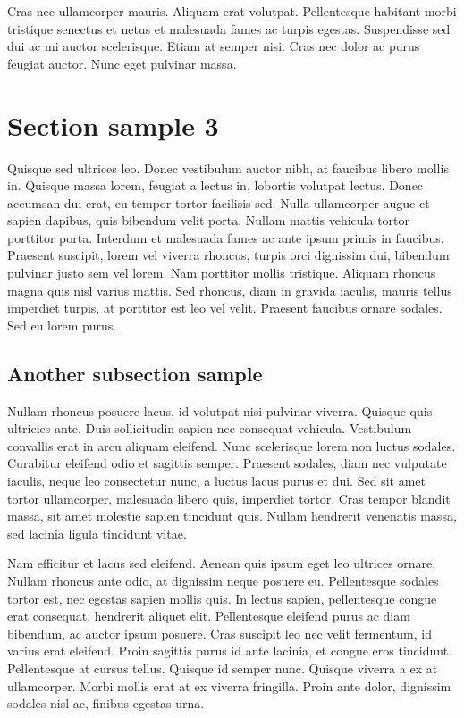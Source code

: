 Cras nec ullamcorper mauris. Aliquam erat volutpat. Pellentesque habitant morbi tristique senectus et netus et malesuada fames ac turpis egestas. Suspendisse sed dui ac mi auctor scelerisque. Etiam at semper nisi. Cras nec dolor ac purus feugiat auctor. Nunc eget pulvinar massa.

%

\section{Section sample 3}

Quisque sed ultrices leo. Donec vestibulum auctor nibh, at faucibus libero mollis in. Quisque massa lorem, feugiat a lectus in, lobortis volutpat lectus. Donec accumsan dui erat, eu tempor tortor facilisis sed. Nulla ullamcorper augue et sapien dapibus, quis bibendum velit porta. Nullam mattis vehicula tortor porttitor porta. Interdum et malesuada fames ac ante ipsum primis in faucibus. Praesent suscipit, lorem vel viverra rhoncus, turpis orci dignissim dui, bibendum pulvinar justo sem vel lorem. Nam porttitor mollis tristique. Aliquam rhoncus magna quis nisl varius mattis. Sed rhoncus, diam in gravida iaculis, mauris tellus imperdiet turpis, at porttitor est leo vel velit. Praesent faucibus ornare sodales. Sed eu lorem purus.  

\subsection{Another subsection sample}

Nullam rhoncus posuere lacus, id volutpat nisi pulvinar viverra. Quisque quis ultricies ante. Duis sollicitudin sapien nec consequat vehicula. Vestibulum convallis erat in arcu aliquam eleifend. Nunc scelerisque lorem non luctus sodales. Curabitur eleifend odio et sagittis semper. Praesent sodales, diam nec vulputate iaculis, neque leo consectetur nunc, a luctus lacus purus et dui. Sed sit amet tortor ullamcorper, malesuada libero quis, imperdiet tortor. Cras tempor blandit massa, sit amet molestie sapien tincidunt quis. Nullam hendrerit venenatis massa, sed lacinia ligula tincidunt vitae.

Nam efficitur et lacus sed eleifend. Aenean quis ipsum eget leo ultrices ornare. Nullam rhoncus ante odio, at dignissim neque posuere eu. Pellentesque sodales tortor est, nec egestas sapien mollis quis. In lectus sapien, pellentesque congue erat consequat, hendrerit aliquet elit. Pellentesque eleifend purus ac diam bibendum, ac auctor ipsum posuere. Cras suscipit leo nec velit fermentum, id varius erat eleifend. Proin sagittis purus id ante lacinia, et congue eros tincidunt. Pellentesque at cursus tellus. Quisque id semper nunc. Quisque viverra a ex at ullamcorper. Morbi mollis erat at ex viverra fringilla. Proin ante dolor, dignissim sodales nisl ac, finibus egestas urna.

